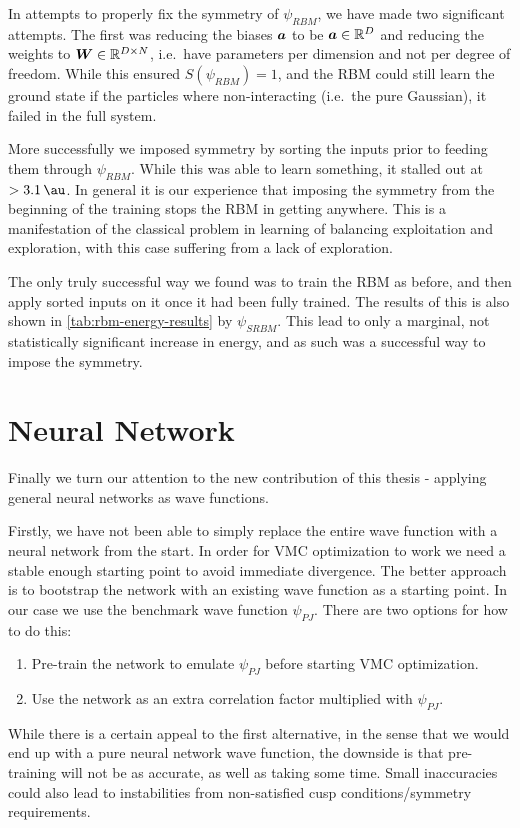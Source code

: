\documentclass[Thesis.tex]{subfiles}
\begin{document}
In attempts to properly fix the symmetry of $\psi_{RBM}$, we have made two significant
attempts. The first was reducing the biases $\bm{a}$ to be $\bm{a}\in\mathbb{R}^D$
and reducing the weights to
$\bm{W}\in\mathbb{R}^{D\times N}$, i.e.\ have parameters per dimension and not
per degree of freedom. While this ensured
$S(\psi_{RBM})=1$, and the RBM could still learn the ground state if the particles where
non-interacting (i.e.\ the pure Gaussian), it failed in the full system.

More successfully we imposed symmetry by sorting the inputs prior to feeding
them through $\psi_{RBM}$. While this was able to learn something, it stalled
out at $>\SI{3.1}{\au}$. In general it is our experience that imposing the
symmetry from the beginning of the training stops the RBM in getting anywhere.
This is a manifestation of the classical problem in learning of balancing
exploitation and exploration, with this case suffering from a lack of exploration.

The only truly successful way we found was to train the RBM as before, and then
apply sorted inputs on it once it had been fully trained. The results of this is
also shown in \cref{tab:rbm-energy-results} by $\psi_{SRBM}$. This lead to only a
marginal, not statistically significant increase in energy, and as such was a
successful way to impose the symmetry.

\section{Neural Network}

Finally we turn our attention to the new contribution of this thesis - applying
general neural networks as wave functions.

Firstly, we have not been able to simply replace the entire wave function with a
neural network from the start. In order for VMC optimization to work we need a
stable enough starting point to avoid immediate divergence. The better approach
is to bootstrap the network with an existing wave function as a starting point.
In our case we use the benchmark wave function $\psi_{PJ}$. There are two
options for how to do this:

\begin{enumerate}
\item Pre-train the network to emulate $\psi_{PJ}$ before starting VMC
  optimization.
\item Use the network as an extra correlation factor multiplied with $\psi_{PJ}$.
\end{enumerate}
While there is a certain appeal to the first alternative, in the
sense that we would end up with a pure neural network wave function, the
downside is that pre-training will not be as accurate, as well as taking
some time. Small inaccuracies could also lead to instabilities from non-satisfied
cusp conditions/symmetry requirements.
\end{document}
